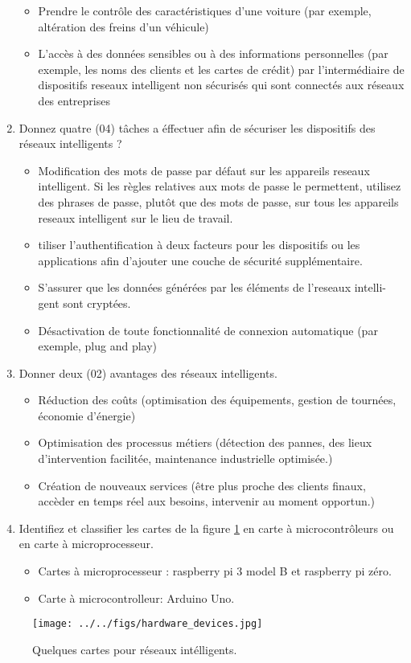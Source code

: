 \begin{enumerate}
\begin{itemize}
              \item Prendre le contrôle des caractéristiques d’une voiture (par exemple,
                    altération des freins d’un véhicule)
              \item L’accès à des données sensibles ou à des informations personnelles (par
                    exemple, les noms des clients et les cartes de crédit) par l’intermédiaire
                    de dispositifs reseaux intelligent non sécurisés qui sont connectés aux
                    réseaux des entreprises
          \end{itemize}
    \item Donnez quatre (04) tâches a éffectuer afin de sécuriser les dispositifs des réseaux intelligents ?
          \begin{itemize}
              \item Modification des mots de passe par défaut sur les appareils reseaux
                    intelligent. Si les règles relatives aux mots de passe le permettent,
                    utilisez des phrases de passe, plutôt que des mots de passe, sur tous les
                    appareils reseaux intelligent sur le lieu de travail.
              \item tiliser l’authentification à deux facteurs pour les dispositifs ou les
                    applications afin d’ajouter une couche de sécurité supplémentaire.
              \item S’assurer que les données générées par les éléments de l’reseaux intelli-
                    gent sont cryptées.
              \item Désactivation de toute fonctionnalité de connexion automatique (par
                    exemple, plug and play)
          \end{itemize}
    \item Donner deux (02) avantages des réseaux intelligents.
          \begin{itemize}
              \item Réduction des coûts (optimisation des équipements, gestion de tournées, économie d’énergie)
              \item Optimisation des processus métiers (détection des pannes, des lieux d’intervention facilitée, maintenance industrielle optimisée.)
              \item Création de nouveaux services (être plus proche des clients finaux, accèder en temps réel aux besoins, intervenir au moment opportun.)
          \end{itemize}
    \item Identifiez et classifier les cartes de la figure \ref{fig:carte} en carte à microcontrôleurs ou en carte à microprocesseur.
          \begin{itemize}
              \item Cartes à microprocesseur : raspberry pi 3 model B et raspberry pi zéro.
              \item Carte à microcontrolleur: Arduino Uno.
          \end{itemize}
\end{enumerate}

\begin{figure}[!ht]
    \centering
    \texttt{[image: ../../figs/hardware\_devices.jpg]}
    \caption{Quelques cartes pour réseaux intélligents.\label{fig:carte}}
\end{figure}